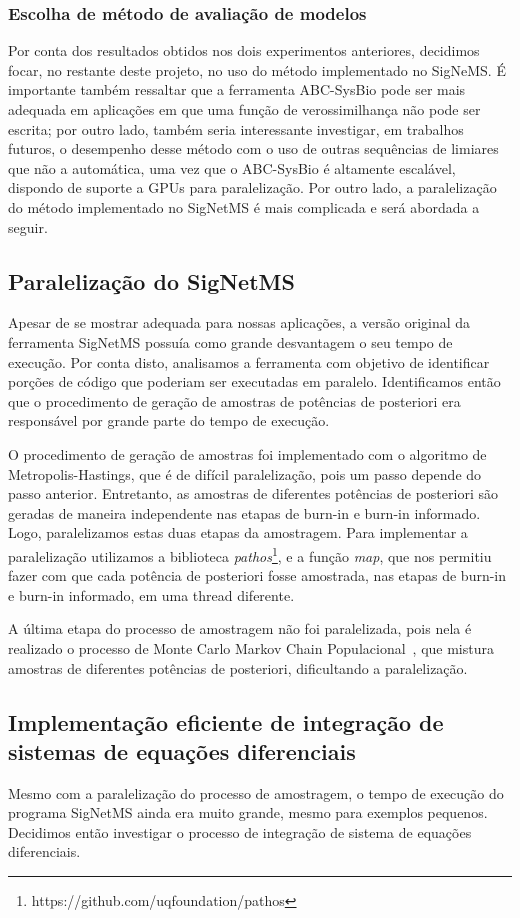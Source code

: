 \documentclass[12pt]{article}
\newcommand{\toolname}[1]{\textit{#1}}
\begin{document}
\subsubsection{Escolha de método de avaliação de modelos}
Por conta dos resultados obtidos nos dois experimentos anteriores, decidimos focar, no restante deste projeto, no uso do método implementado no SigNeMS. É importante também ressaltar que a ferramenta ABC-SysBio pode ser mais adequada em aplicações em que uma função de verossimilhança não pode ser escrita; por outro lado, também seria interessante investigar, em trabalhos futuros, o desempenho desse método com o uso de outras sequências de limiares que não a automática, uma vez que o ABC-SysBio é altamente escalável, dispondo de suporte a GPUs para paralelização. Por outro lado, a paralelização do método implementado no SigNetMS é mais complicada e será abordada a seguir.

\subsection{Paralelização do SigNetMS}
Apesar de se mostrar adequada para nossas aplicações, a versão original da ferramenta
SigNetMS possuía como grande desvantagem o seu tempo de execução. Por
conta disto, analisamos a ferramenta com objetivo de identificar porções 
de código que poderiam ser executadas em paralelo. Identificamos então
que o procedimento de geração de amostras de potências de posteriori era 
responsável por grande parte do tempo de execução.

O procedimento de geração de amostras foi implementado com o algoritmo
de Metropolis-Hastings, que é de difícil paralelização, pois um passo
depende do passo anterior. Entretanto, as amostras de diferentes
potências de posteriori são geradas de maneira independente nas etapas
de burn-in e burn-in informado. Logo, paralelizamos estas duas etapas da
amostragem. Para implementar a paralelização utilizamos a biblioteca
\toolname{pathos}\footnote{https://github.com/uqfoundation/pathos},
e a função \toolname{map}, que nos permitiu fazer com que cada potência
de posteriori fosse amostrada, nas etapas de burn-in e burn-in
informado, em uma thread diferente.

A última etapa do processo de amostragem não foi paralelizada, pois nela
é realizado o processo de Monte Carlo Markov Chain
Populacional~\cite{Friel2008}, que mistura amostras de diferentes
potências de posteriori, dificultando a paralelização.

\subsection{Implementação eficiente de integração de sistemas de
equações diferenciais}
Mesmo com a paralelização do processo de amostragem, o tempo de execução
do programa SigNetMS ainda era muito grande, mesmo para exemplos
pequenos. Decidimos então investigar o processo de integração de sistema
de equações diferenciais.
\end{document}
